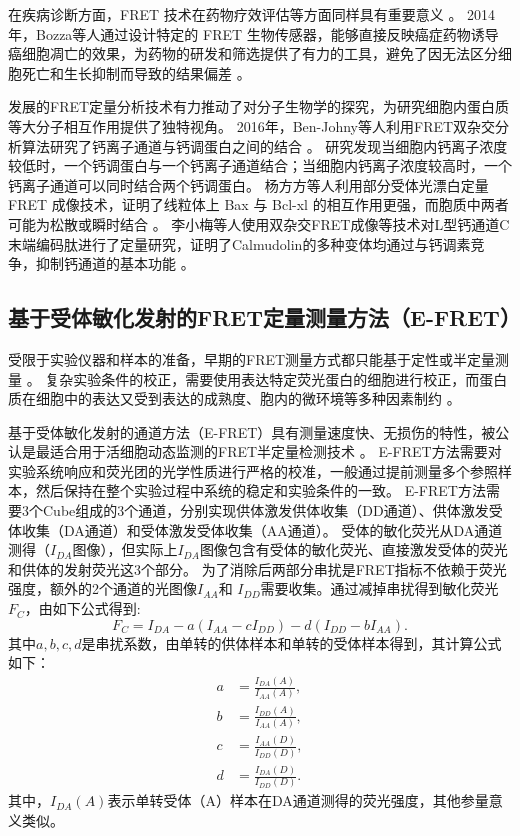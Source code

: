 在疾病诊断方面，FRET 技术在药物疗效评估等方面同样具有重要意义 。
2014年，Bozza等人通过设计特定的 FRET 生物传感器，能够直接反映癌症药物诱导癌细胞凋亡的效果，为药物的研发和筛选提供了有力的工具，避免了因无法区分细胞死亡和生长抑制而导致的结果偏差 。

发展的FRET定量分析技术有力推动了对分子生物学的探究，为研究细胞内蛋白质等大分子相互作用提供了独特视角。
2016年，Ben-Johny等人利用FRET双杂交分析算法研究了钙离子通道与钙调蛋白之间的结合 。
研究发现当细胞内钙离子浓度较低时，一个钙调蛋白与一个钙离子通道结合；当细胞内钙离子浓度较高时，一个钙离子通道可以同时结合两个钙调蛋白。
杨方方等人利用部分受体光漂白定量 FRET 成像技术，证明了线粒体上 Bax 与 Bcl-xl 的相互作用更强，而胞质中两者可能为松散或瞬时结合 。
李小梅等人使用双杂交FRET成像等技术对L型钙通道C末端编码肽进行了定量研究，证明了Calmudolin的多种变体均通过与钙调素竞争，抑制钙通道的基本功能 。

\fi

\subsection{基于受体敏化发射的FRET定量测量方法（E-FRET）}

\ifshowtext
受限于实验仪器和样本的准备，早期的FRET测量方式都只能基于定性或半定量测量 。
复杂实验条件的校正，需要使用表达特定荧光蛋白的细胞进行校正，而蛋白质在细胞中的表达又受到表达的成熟度、胞内的微环境等多种因素制约 。

基于受体敏化发射的通道方法（E-FRET）具有测量速度快、无损伤的特性，被公认是最适合用于活细胞动态监测的FRET半定量检测技术 。
E-FRET方法需要对实验系统响应和荧光团的光学性质进行严格的校准，一般通过提前测量多个参照样本，然后保持在整个实验过程中系统的稳定和实验条件的一致。
E-FRET方法需要3个Cube组成的3个通道，分别实现供体激发供体收集（DD通道）、供体激发受体收集（DA通道）和受体激发受体收集（AA通道）。
受体的敏化荧光从DA通道测得（$I_{DA}$图像），但实际上$I_{DA}$图像包含有受体的敏化荧光、直接激发受体的荧光和供体的发射荧光这3个部分。
为了消除后两部分串扰是FRET指标不依赖于荧光强度，额外的2个通道的光图像$I_{AA}$和 $I_{DD}$需要收集。通过减掉串扰得到敏化荧光$F_C$，由如下公式得到:
\begin{equation}
F_C=I_{DA}-a(I_{AA}-cI_{DD})-d(I_{DD}-bI_{AA}).
\label{eq:fc}
\end{equation}
其中$a, b, c, d$是串扰系数，由单转的供体样本和单转的受体样本得到，其计算公式如下：
\begin{align}
a&=\frac{I_{DA}(A)}{I_{AA}(A)}, \label{eq:a}\\
b&=\frac{I_{DD}(A)}{I_{AA}(A)}, \label{eq:b}\\ 
c&=\frac{I_{AA}(D)}{I_{DD}(D)}, \label{eq:c}\\ 
d&=\frac{I_{DA}(D)}{I_{DD}(D)}. \label{eq:d}
\end{align}
其中，$I_{DA}(A)$表示单转受体（A）样本在DA通道测得的荧光强度，其他参量意义类似。


